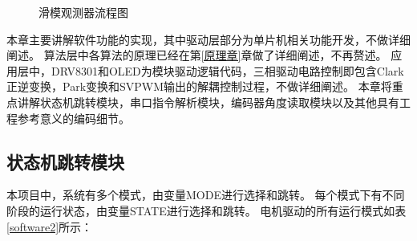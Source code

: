 ﻿\documentclass[12pt,a4paper]{article}
\begin{document}
\begin{figure}[htbp]
\begin{minipage}{0.3\linewidth}
    \caption{滑模观测器流程图}
    \label{PRO2}%
  \end{minipage} 	%
\end{figure}

本章主要讲解软件功能的实现，其中驱动层部分为单片机相关功能开发，不做详细阐述。
算法层中各算法的原理已经在第\ref{原理章}章做了详细阐述，不再赘述。
应用层中，DRV8301和OLED为模块驱动逻辑代码，三相驱动电路控制即包含Clark正逆变换，Park变换和SVPWM输出的解耦控制过程，不做详细阐述。
本章将重点讲解状态机跳转模块，串口指令解析模块，编码器角度读取模块以及其他具有工程参考意义的编码细节。

\subsection{状态机跳转模块}
本项目中，系统有多个模式，由变量MODE进行选择和跳转。
每个模式下有不同阶段的运行状态，由变量STATE进行选择和跳转。
电机驱动的所有运行模式如表\ref{software2}所示：


\end{document}

